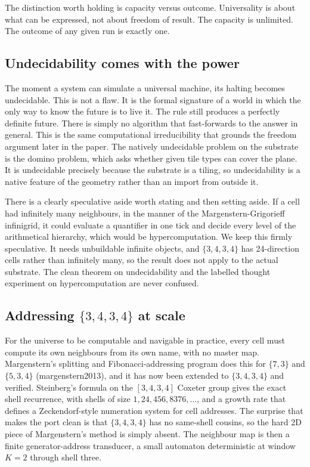 The distinction worth holding is capacity versus outcome. Universality is about what can be expressed, not about freedom of result. The capacity is unlimited. The outcome of any given run is exactly one.

\subsection{Undecidability comes with the power}

The moment a system can simulate a universal machine, its halting becomes undecidable. This is not a flaw. It is the formal signature of a world in which the only way to know the future is to live it. The rule still produces a perfectly definite future. There is simply no algorithm that fast-forwards to the answer in general. This is the same computational irreducibility that grounds the freedom argument later in the paper. The natively undecidable problem on the substrate is the domino problem, which asks whether given tile types can cover the plane. It is undecidable precisely because the substrate is a tiling, so undecidability is a native feature of the geometry rather than an import from outside it.

There is a clearly speculative aside worth stating and then setting aside. If a cell had infinitely many neighbours, in the manner of the Margenstern-Grigorieff infinigrid, it could evaluate a quantifier in one tick and decide every level of the arithmetical hierarchy, which would be hypercomputation. We keep this firmly speculative. It needs unbuildable infinite objects, and $\{3,4,3,4\}$ has 24-direction cells rather than infinitely many, so the result does not apply to the actual substrate. The clean theorem on undecidability and the labelled thought experiment on hypercomputation are never confused.

\subsection{Addressing $\{3,4,3,4\}$ at scale}

For the universe to be computable and navigable in practice, every cell must compute its own neighbours from its own name, with no master map. Margenstern's splitting and Fibonacci-addressing program does this for $\{7,3\}$ and $\{5,3,4\}$ (margenstern2013), and it has now been extended to $\{3,4,3,4\}$ and verified. Steinberg's formula on the $[3,4,3,4]$ Coxeter group gives the exact shell recurrence, with shells of size $1, 24, 456, 8376, \ldots$, and a growth rate that defines a Zeckendorf-style numeration system for cell addresses. The surprise that makes the port clean is that $\{3,4,3,4\}$ has no same-shell cousins, so the hard 2D piece of Margenstern's method is simply absent. The neighbour map is then a finite generator-address transducer, a small automaton deterministic at window $K=2$ through shell three.

